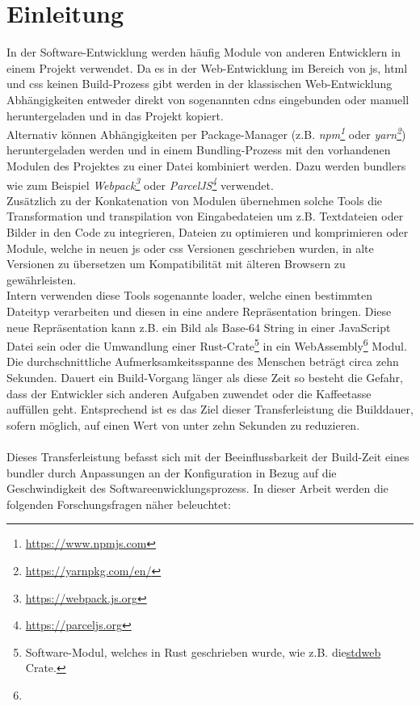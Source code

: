 \documentclass[11pt]{report}
\begin{document}
    \chapter{Einleitung}
    	In der Software-Entwicklung werden häufig Module von anderen Entwicklern in einem Projekt verwendet. Da es in der Web-Entwicklung im Bereich von \Gls{js}, \Gls{html} und \Gls{css} keinen Build-Prozess gibt werden in der klassischen Web-Entwicklung Abhängigkeiten entweder direkt von sogenannten \Glspl{cdn} eingebunden oder manuell heruntergeladen und in das Projekt kopiert.\\
		Alternativ können Abhängigkeiten per Package-Manager (z.B. \emph{npm\footnote{\url{https://www.npmjs.com}}} oder \emph{yarn\footnote{\url{https://yarnpkg.com/en/}}}) heruntergeladen werden und in einem Bundling-Prozess mit den vorhandenen Modulen des Projektes zu einer Datei kombiniert werden. Dazu werden \Glspl{bundler} wie zum Beispiel \emph{Webpack\footnote{\url{https://webpack.js.org}}} oder \emph{ParcelJS\footnote{\url{https://parceljs.org}}} verwendet.\\
		Zusätzlich zu der Konkatenation von Modulen übernehmen solche Tools die Transformation und \Gls{transpilation} von Eingabedateien um z.B. Textdateien oder Bilder in den Code zu integrieren, Dateien zu optimieren und komprimieren oder Module, welche in neuen \Gls{js} oder \Gls{css} Versionen geschrieben wurden, in alte Versionen zu übersetzen um Kompatibilität mit älteren Browsern zu gewährleisten.\\
		Intern verwenden diese Tools sogenannte \Gls{loader}, welche einen bestimmten Dateityp verarbeiten und diesen in eine andere Repräsentation bringen. Diese neue Repräsentation kann z.B. ein Bild als Base-64 String in einer JavaScript Datei sein oder die Umwandlung einer Rust-Crate\footnote{Software-Modul, welches in Rust geschrieben wurde, wie z.B. die\href{https://crates.io/crates/stdweb}{stdweb} Crate.} in ein WebAssembly\footnote{} Modul. 
		Die durchschnittliche Aufmerksamkeitsspanne des Menschen beträgt circa zehn Sekunden. Dauert ein Build-Vorgang länger als diese Zeit so besteht die Gefahr, dass der Entwickler sich anderen Aufgaben zuwendet oder die Kaffeetasse auffüllen geht. Entsprechend ist es das Ziel dieser Transferleistung die Builddauer, sofern möglich, auf einen Wert von unter zehn Sekunden zu reduzieren.\\
		\\
    	Dieses Transferleistung befasst sich mit der Beeinflussbarkeit der Build-Zeit eines \Gls{bundler} durch Anpassungen an der Konfiguration in Bezug auf die Geschwindigkeit des Softwareenwicklungsprozess. In dieser Arbeit werden die folgenden Forschungsfragen näher beleuchtet:
\end{document}
